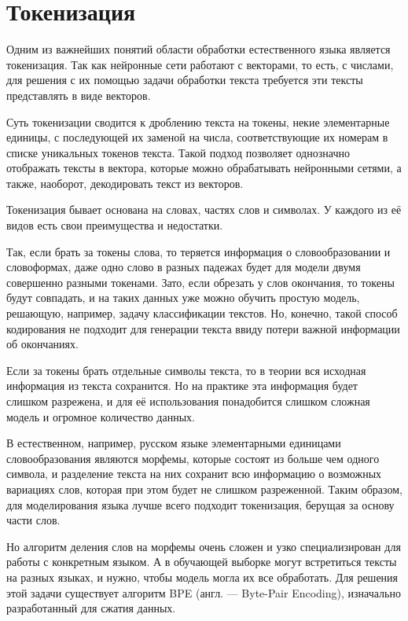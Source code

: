 \section{Токенизация}

Одним из важнейших понятий области обработки естественного языка является токенизация. Так как нейронные сети работают с векторами, то есть, с числами, для решения с их помощью задачи обработки текста требуется эти тексты представлять в виде векторов.

Суть токенизации сводится к дроблению текста на токены, некие элементарные единицы, с последующей их заменой на числа, соответствующие их номерам в списке уникальных токенов текста. Такой подход позволяет однозначно отображать тексты в вектора, которые можно обрабатывать нейронными сетями, а также, наоборот, декодировать текст из векторов.

Токенизация бывает основана на словах, частях слов и символах. У каждого из её видов есть свои преимущества и недостатки.

Так, если брать за токены слова, то теряется информация о словообразовании и словоформах, даже одно слово в разных падежах будет для модели двумя совершенно разными токенами. Зато, если обрезать у слов окончания, то токены будут совпадать, и на таких данных уже можно обучить простую модель, решающую, например, задачу классификации текстов. Но, конечно, такой способ кодирования не подходит для генерации текста ввиду потери важной информации об окончаниях.

Если за токены брать отдельные символы текста, то в теории вся исходная информация из текста сохранится. Но на практике эта информация будет слишком разрежена, и для её использования понадобится слишком сложная модель и огромное количество данных.

В естественном, например, русском языке элементарными единицами словообразования являются морфемы, которые состоят из больше чем одного символа, и разделение текста на них сохранит всю информацию о возможных вариациях слов, которая при этом будет не слишком разреженной. Таким образом, для моделирования языка лучше всего подходит токенизация, берущая за основу части слов.

Но алгоритм деления слов на морфемы очень сложен и узко специализирован для работы с конкретным языком. А в обучающей выборке могут встретиться тексты на разных языках, и нужно, чтобы модель могла их все обработать. Для решения этой задачи существует алгоритм BPE (англ. --- Byte-Pair Encoding), изначально разработанный для сжатия данных.

